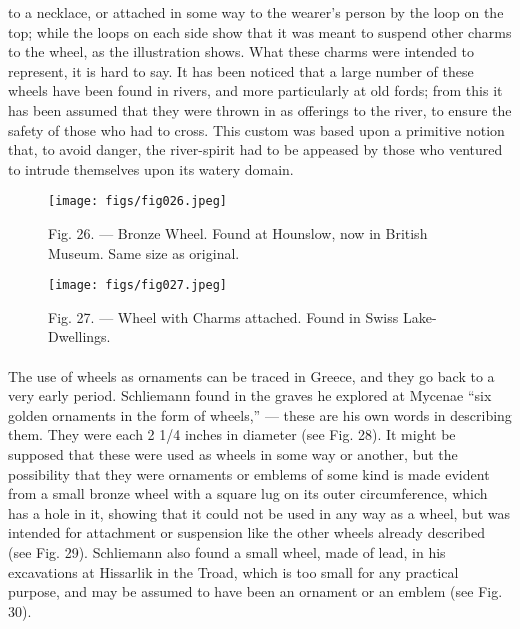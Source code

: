 \documentclass[a4paper, 11pt, oneside, polutonikogreek, english]{article}
\begin{document}
to a necklace, or attached in some way to the wearer's person by the loop on the top; while the loops on each side show that it was meant to suspend other charms to the wheel, as the illustration shows. What these charms were intended to represent, it is hard to say. It has been noticed that a large number of these wheels have been found in rivers, and more particularly at old fords; from this it has been assumed that they were thrown in as offerings to the river, to ensure the safety of those who had to cross. This custom was based upon a primitive notion that, to avoid danger, the river-spirit had to be appeased by those who ventured to intrude themselves upon its watery domain.

\begin{figure}[H]
\centering
\texttt{[image: figs/fig026.jpeg]}
\caption[Fig. 26. --- Bronze Wheel.]{Fig. 26. --- Bronze Wheel. Found at Hounslow, now in British Museum. Same size as original.}
\end{figure}

\begin{figure}[H]
\centering
\texttt{[image: figs/fig027.jpeg]}
\caption[Fig. 27. --- Wheel with Charms attached.]{Fig. 27. --- Wheel with Charms attached. Found in Swiss Lake-Dwellings.\footnotemark}
\end{figure}
\paragraph{}
The use of wheels as ornaments can be traced in Greece, and they go back to a very early period. Schliemann found in the graves he explored at Mycenae ``six golden ornaments in the form of wheels,'' --- these are his own words in describing them. They were each 2 1/4 inches in diameter (see Fig. 28). It might be supposed that these were used as wheels in some way or another, but the possibility that they were ornaments or emblems of some kind is made evident from a small bronze wheel with a square lug on its outer circumference, which has a hole in it, showing that it could not be used in any way as a wheel, but was intended for attachment or suspension like the other wheels already described (see Fig. 29). Schliemann also found a small wheel, made of lead, in his excavations at Hissarlik in the Troad, which is too small for any practical purpose, and may be assumed to have been an ornament or an emblem (see Fig. 30).
\end{document}
